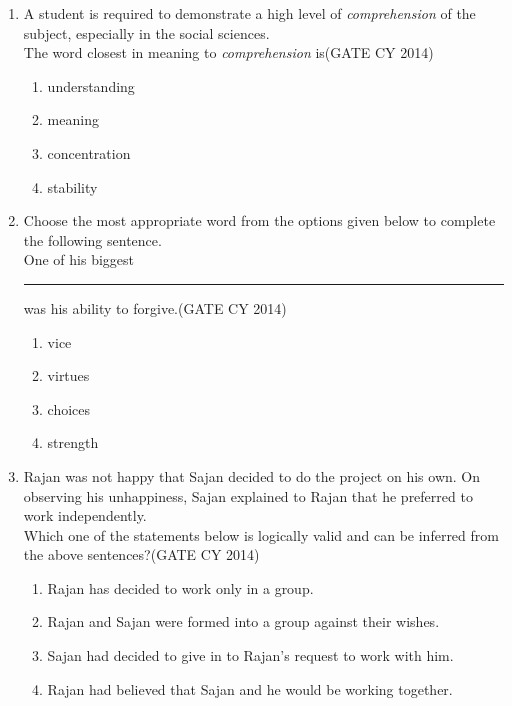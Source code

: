 \documentclass[a4paper,10pt]{exam}
\theoremstyle{remark}
\begin{document}
\begin{enumerate}
    \item A student is required to demonstrate a high level of \emph{comprehension} of the subject, especially in the social sciences.\\
    The word closest in meaning to \emph{comprehension} is\hfill{(GATE CY 2014)}

    \begin{multicols}{4}
    \begin{enumerate}
        \item understanding
        \item meaning
        \item concentration
        \item stability
    \end{enumerate}
    \end{multicols}

    \item Choose the most appropriate word from the options given below to complete the following sentence.\\
    One of his biggest \rule{1.5cm}{0.15mm} was his ability to forgive.\hfill{(GATE CY 2014)}

    \begin{multicols}{4}
    \begin{enumerate}
        \item vice
        \item virtues
        \item choices
        \item strength
    \end{enumerate}
    \end{multicols}

    \item Rajan was not happy that Sajan decided to do the project on his own. On observing his unhappiness, Sajan explained to Rajan that he preferred to work independently.\\
    Which one of the statements below is logically valid and can be inferred from the above sentences?\hfill{(GATE CY 2014)}

    \begin{enumerate}
        \item Rajan has decided to work only in a group.
        \item Rajan and Sajan were formed into a group against their wishes.
        \item Sajan had decided to give in to Rajan's request to work with him.
        \item Rajan had believed that Sajan and he would be working together.
    \end{enumerate}


\end{enumerate}
\end{document}
